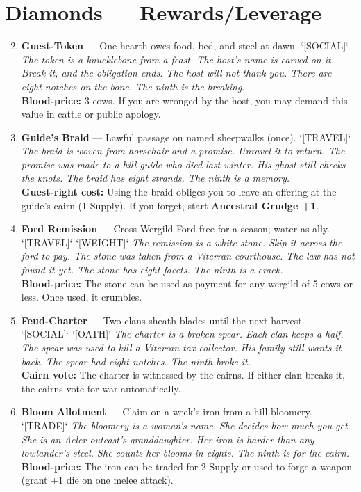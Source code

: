 \section{Diamonds --- Rewards/Leverage}
\label{sec:ubral-rewards}
\begin{enumerate}
\setcounter{enumi}{1}
\item \textbf{Guest-Token} --- One hearth owes food, bed, and steel at dawn. `[SOCIAL]`
  \hfill \textit{The token is a knucklebone from a feast. The host's name is carved on it. Break it, and the obligation ends. The host will not thank you. There are eight notches on the bone. The ninth is the breaking.} \\
  \textbf{Blood-price:} 3 cows. If you are wronged by the host, you may demand this value in cattle or public apology.

\item \textbf{Guide's Braid} --- Lawful passage on named sheepwalks (once). `[TRAVEL]`
  \hfill \textit{The braid is woven from horsehair and a promise. Unravel it to return. The promise was made to a hill guide who died last winter. His ghost still checks the knots. The braid has eight strands. The ninth is a memory.} \\
  \textbf{Guest-right cost:} Using the braid obliges you to leave an offering at the guide's cairn (1 Supply). If you forget, start \textbf{Ancestral Grudge +1}.

\item \textbf{Ford Remission} --- Cross Wergild Ford free for a season; water as ally. `[TRAVEL]` `[WEIGHT]`
  \hfill \textit{The remission is a white stone. Skip it across the ford to pay. The stone was taken from a Viterran courthouse. The law has not found it yet. The stone has eight facets. The ninth is a crack.} \\
  \textbf{Blood-price:} The stone can be used as payment for any wergild of 5 cows or less. Once used, it crumbles.

\item \textbf{Feud-Charter} --- Two clans sheath blades until the next harvest. `[SOCIAL]` `[OATH]`
  \hfill \textit{The charter is a broken spear. Each clan keeps a half. The spear was used to kill a Viterran tax collector. His family still wants it back. The spear had eight notches. The ninth broke it.} \\
  \textbf{Cairn vote:} The charter is witnessed by the cairns. If either clan breaks it, the cairns vote for war automatically.

\item \textbf{Bloom Allotment} --- Claim on a week's iron from a hill bloomery. `[TRADE]`
  \hfill \textit{The bloomery is a woman's name. She decides how much you get. She is an Aeler outcast's granddaughter. Her iron is harder than any lowlander's steel. She counts her blooms in eights. The ninth is for the cairn.} \\
  \textbf{Blood-price:} The iron can be traded for 2 Supply or used to forge a weapon (grant +1 die on one melee attack).


\end{enumerate}
